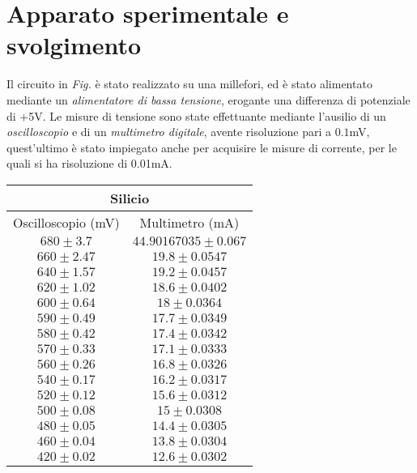 \documentclass[@SRC@/main]{subfiles}
\begin{document}
\section{Apparato sperimentale e svolgimento} \label{sec:acquisizione}
  Il circuito in \textit{Fig.\!\!} è stato realizzato su una millefori, ed è stato alimentato mediante un \textit{alimentatore di bassa tensione}, erogante una differenza di potenziale di +5V. 
  Le misure di tensione sono state effettuante mediante l'ausilio di un \textit{oscilloscopio} e di un \textit{multimetro digitale}, avente risoluzione pari a $0.1$mV, quest'ultimo è stato impiegato anche per acquisire le misure di corrente, per le quali si ha risoluzione di 0.01mA.
  
  
  \begin{center}
    \begin{tabular}{ ||c|c|| }
        \hline
        \multicolumn{2}{||c||}{Silicio}\\
        \hline
        Oscilloscopio (mV) & Multimetro (mA) \\
        \hline
        $680\pm 3.7 $ & $44.90167035\pm 0.067$ \\
        \hline
        $660\pm 2.47$ & $19.8\pm 0.0547$ \\
        \hline
        $640\pm 1.57$ & $19.2\pm 0.0457$ \\
        \hline
        $620\pm 1.02$ & $18.6\pm0.0402$\\
        \hline
        $600\pm  0.64$ & $18\pm0.0364$ \\
        \hline
        $590\pm 0.49 $ & $17.7\pm0.0349$ \\
        \hline
        $580\pm 0.42 $ & $17.4\pm0.0342$ \\
        \hline
        $570\pm 0.33 $ & $17.1\pm0.0333$ \\
        \hline
        $560\pm 0.26 $ & $16.8\pm0.0326$ \\
        \hline
        $540\pm 0.17 $ & $16.2\pm0.0317$ \\
        \hline
        $520\pm 0.12 $ & $15.6\pm0.0312$ \\
        \hline 
        $500\pm 0.08 $ & $ 15\pm0.0308$ \\
        \hline 
        $480\pm 0.05 $ & $14.4\pm0.0305$ \\
        \hline 
        $460\pm 0.04 $ & $ 13.8\pm0.0304$ \\
        \hline 
        $420\pm 0.02 $ & $12.6 \pm0.0302$ \\
        \hline 
        
        
    \end{tabular}   
\end{center}
\end{document}
